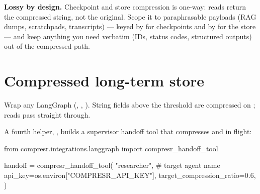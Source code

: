 \documentclass[10pt]{article}
\begin{document}
\begin{cprNoteBox}
\textbf{Lossy by design.} Checkpoint and store compression is one-way:
reads return the compressed string, not the original. Scope it to
paraphrasable payloads (RAG dumps, scratchpads, transcripts) --- keyed by
 for checkpoints and by 
for the store --- and keep anything you need verbatim (IDs, status codes,
structured outputs) out of the compressed path.
\end{cprNoteBox}

\section{Compressed long-term store}

Wrap any LangGraph 
(, ,
). String fields above the threshold are
compressed on ; reads pass straight through.


A fourth helper, ,
builds a supervisor handoff tool that compresses
 and  in flight:

\begin{pycode}
from compresr.integrations.langgraph import compresr_handoff_tool

handoff = compresr_handoff_tool(
    "researcher",                                 # target agent name
    api_key=os.environ["COMPRESR_API_KEY"],
    target_compression_ratio=0.6,
)
\end{pycode}
\end{document}
